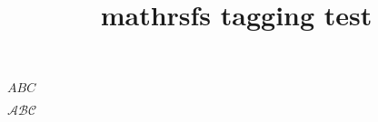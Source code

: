 \documentclass{article}
\title{mathrsfs tagging test}
\begin{document}
$ABC$

$\mathscr{ABC}$
\end{document}
